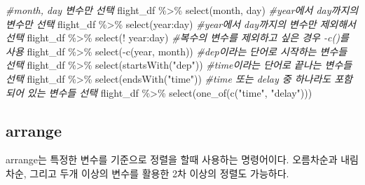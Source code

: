 \documentclass[
]{book}
\newenvironment{Shaded}{\begin{snugshade}}{\end{snugshade}}
\newcommand{\CommentTok}[1]{\textcolor[rgb]{0.56,0.35,0.01}{\textit{#1}}}
\newcommand{\FunctionTok}[1]{\textcolor[rgb]{0.00,0.00,0.00}{#1}}
\newcommand{\NormalTok}[1]{#1}
\newcommand{\SpecialCharTok}[1]{\textcolor[rgb]{0.00,0.00,0.00}{#1}}
\newcommand{\StringTok}[1]{\textcolor[rgb]{0.31,0.60,0.02}{#1}}
\theoremstyle{definition}
\theoremstyle{definition}
\theoremstyle{definition}
\theoremstyle{definition}
\theoremstyle{remark}
\begin{document}
\begin{Shaded}
\begin{Highlighting}[]
\CommentTok{\#month, day 변수만 선택}
\NormalTok{flight\_df }\SpecialCharTok{\%\textgreater{}\%}
  \FunctionTok{select}\NormalTok{(month, day)}
\CommentTok{\#year에서 day까지의 변수만 선택}
\NormalTok{flight\_df }\SpecialCharTok{\%\textgreater{}\%}
  \FunctionTok{select}\NormalTok{(year}\SpecialCharTok{:}\NormalTok{day) }
\CommentTok{\#year에서 day까지의 변수만 제외해서 선택}
\NormalTok{flight\_df }\SpecialCharTok{\%\textgreater{}\%}
  \FunctionTok{select}\NormalTok{(}\SpecialCharTok{!}\NormalTok{ year}\SpecialCharTok{:}\NormalTok{day)}
\CommentTok{\#복수의 변수를 제외하고 싶은 경우 {-}c()를 사용}
\NormalTok{flight\_df }\SpecialCharTok{\%\textgreater{}\%}
  \FunctionTok{select}\NormalTok{(}\SpecialCharTok{{-}}\FunctionTok{c}\NormalTok{(year, month)) }
\CommentTok{\#dep이라는 단어로 시작하는 변수들 선택}
\NormalTok{flight\_df }\SpecialCharTok{\%\textgreater{}\%} 
  \FunctionTok{select}\NormalTok{(}\FunctionTok{startsWith}\NormalTok{(}\StringTok{"dep"}\NormalTok{))}
\CommentTok{\#time이라는 단어로 끝나는 변수들 선택}
\NormalTok{flight\_df }\SpecialCharTok{\%\textgreater{}\%} 
  \FunctionTok{select}\NormalTok{(}\FunctionTok{endsWith}\NormalTok{(}\StringTok{"time"}\NormalTok{))}
\CommentTok{\#time 또는 delay 중 하나라도 포함되어 있는 변수들 선택}
\NormalTok{flight\_df }\SpecialCharTok{\%\textgreater{}\%} 
  \FunctionTok{select}\NormalTok{(}\FunctionTok{one\_of}\NormalTok{(}\FunctionTok{c}\NormalTok{(}\StringTok{"time"}\NormalTok{, }\StringTok{"delay"}\NormalTok{)))}
\end{Highlighting}
\end{Shaded}

\hypertarget{arrange}{%
\subsection{arrange}\label{arrange}}

arrange는 특정한 변수를 기준으로 정렬을 할때 사용하는 명령어이다. 오름차순과 내림차순, 그리고 두개 이상의 변수를 활용한 2차 이상의 정렬도 가능하다.
\end{document}
